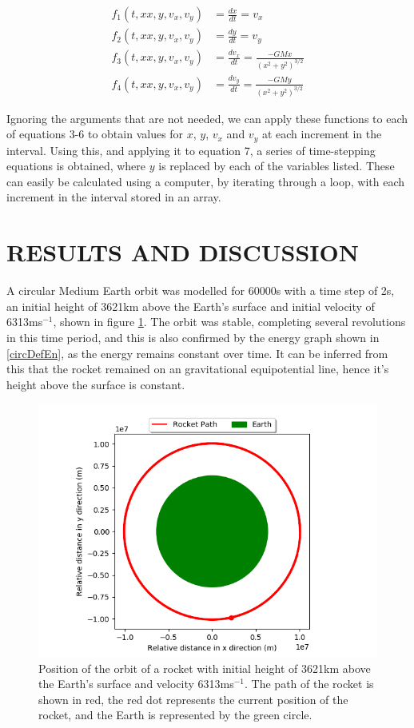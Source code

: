\documentclass[twocolumn,prl,nobalancelastpage,aps,10pt]{revtex4-1}
\begin{document}
\begin{align}
f_{1}(t, xx, y, v_{x}, v_{y})& = \frac{dx}{dt} = v_{x}\\
f_{2}(t, xx, y, v_{x}, v_{y})& = \frac{dy}{dt} = v_{y}\\
f_{3}(t, xx, y, v_{x}, v_{y})& = \frac{dv_{x}}{dt} = \frac{-GMx}{(x^{2} + y^{2})^{3/2}}\\
f_{4}(t, xx, y, v_{x}, v_{y})& = \frac{dv_{y}}{dt} = \frac{-GMy}{(x^{2} + y^{2})^{3/2}}
\end{align}

Ignoring the arguments that are not needed, we can apply these functions to each of equations 3-6 to obtain values for $x$, $y$, $v_{x}$ and $v_{y}$ at each increment in the interval. Using this, and applying it to equation 7, a series of time-stepping equations is obtained, where $y$ is replaced by each of the variables listed. These can easily be calculated using a computer, by iterating through a loop, with each increment in the interval stored in an array.

\section{RESULTS AND DISCUSSION}

A circular Medium Earth orbit was modelled for 60000s with a time step of 2s, an initial height of 3621km above the Earth's surface and initial velocity of 6313ms$^{-1}$, shown in figure \ref{circDefFig}. The orbit was stable, completing several revolutions in this time period, and this is also confirmed by the energy graph shown in \ref{circDefEn}, as the energy remains constant over time. It can be inferred from this that the rocket remained on an gravitational equipotential line, hence it's height above the surface is constant.

\begin{figure}[ht!]
\includegraphics*[width=0.96\linewidth,clip]{circularDefault}
\caption{Position of the orbit of a rocket with initial height of 3621km above the Earth's surface and velocity 6313ms$^{-1}$. The path of the rocket is shown in red, the red dot represents the current position of the rocket, and the Earth is represented by the green circle.} \label{circDefFig}
\end{figure}
\end{document}
